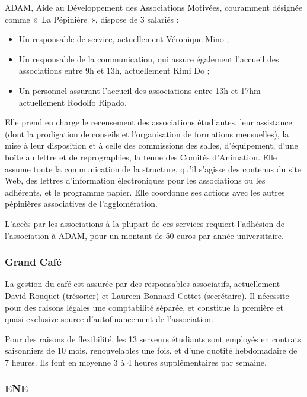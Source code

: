 ADAM, Aide au Développement des Associations Motivées, couramment désignée
comme «~La Pépinière~», dispose de 3 salariés :
\begin{itemize}
\item Un responsable de service, actuellement Véronique Mino ;
\item Un responsable de la communication, qui assure également l'accueil
      des associations entre 9h et 13h, actuellement Kimi Do ;
\item Un personnel assurant l'accueil des associations entre 13h et 17hm
      actuellement Rodolfo Ripado.
\end{itemize}

Elle prend en charge le recensement des associations étudiantes, leur assistance
(dont la prodigation de conseils et l'organisation de formations mensuelles),
la mise à leur disposition et à celle des commissions des salles, d'équipement,
d'une boîte au lettre et de reprographies, la tenue des Comités d'Animation.
Elle assume toute la communication de la structure, qu'il s'agisse des contenus
du site Web, des lettres d'information électroniques pour les associations ou
les adhérents, et le programme papier.
Elle coordonne ses actions avec les autres pépinières associatives de
l'agglomération.

L'accès par les associations à la plupart de ces services requiert l'adhésion
de l'association à ADAM, pour un montant de 50 euros par année universitaire.

\subsubsection{Grand Café}

La gestion du café est assurée par des responsables associatifs, actuellement
David Rouquet (trésorier) et Laureen Bonnard-Cottet (secrétaire).
Il nécessite pour des raisons légales une comptabilité séparée,
et constitue la première et quasi-exclusive source d'autofinancement de
l'association.

Pour des raisons de flexibilité, les 13 serveurs étudiants sont employés en
contrats saisonniers de 10 mois, renouvelables une fois, et d'une quotité
hebdomadaire de 7 heures. Ils font en moyenne 3 à 4 heures supplémentaires
par semaine.

\subsubsection{ENE}

